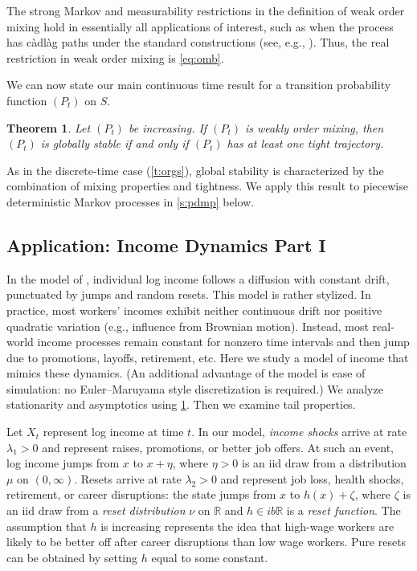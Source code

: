 \documentclass[12pt,reqno]{amsart}
\numberwithin{equation}{section}
\newtheorem{theorem}{Theorem}[section]
\theoremstyle{definition}
\newcommand{\1}{\mathbbm{1}}
\newcommand{\RR}{\mathbb{R}}
\newcommand{\lam}{\lambda}
\newcommand{\navy}[1]{\textit{\textcolor{blue!40!black}{#1}}}
\begin{document}
The strong Markov and measurability restrictions in the definition of weak order
mixing hold in essentially all applications of interest, such as when the
process has c\`adl\`ag paths under the standard constructions (see, e.g.,
\cite{ethier2009markov}).  Thus, the real restriction in weak
order mixing is \eqref{eq:omb}.

We can now state our main continuous time result for 
a transition probability function $(P_t)$ on $S$.

\begin{theorem}\label{t:orgsnew}
    Let $(P_t)$ be increasing. If
    $(P_t)$ is weakly order mixing, then $(P_t)$ is globally stable if and only
    if $(P_t)$ has at least one tight trajectory.
\end{theorem}

As in the discrete-time case (\cref{t:orgs}), global stability is
characterized by the combination of mixing properties and tightness.
We apply this result to piecewise deterministic Markov processes in
\cref{s:pdmp} below.




\subsection{Application: Income Dynamics Part I}\label{ss:purejump}

In the model of \citet{gabaix2016dynamics}, individual log income follows a
diffusion with constant drift, punctuated by jumps and random resets.  This
model is rather stylized. In practice, most workers' incomes exhibit neither
continuous drift nor positive quadratic variation (e.g., influence from Brownian
motion). Instead, most real-world income processes 
remain constant for nonzero time intervals and then jump due to
promotions, layoffs, retirement, etc.  Here we
study a model of income that mimics these dynamics.
(An additional advantage of the model is ease of simulation: no Euler--Maruyama
style discretization is required.) We analyze stationarity and asymptotics using
\cref{t:orgsnew}.  Then we examine tail properties.

Let $X_t$ represent log income at time $t$.
In our model, \navy{income shocks} arrive at rate $\lam_1 > 0$ and represent raises,
promotions, or better job offers. At such an event, log income jumps from $x$ to
$x + \eta$, where $\eta > 0$ is an {\sc iid} draw from a distribution $\mu$ on
$(0,\infty)$.  Resets arrive at rate $\lam_2 > 0$ and represent job loss, health
shocks, retirement, or career disruptions: the state jumps from $x$ to $h(x) +
\zeta$, where $\zeta$ is an {\sc iid} draw from a \navy{reset distribution} $\nu$ on $\RR$
and $h \in ib\RR$ is a \navy{reset function}.  The assumption that $h$ is increasing
represents the idea that high-wage workers are likely to be better off after
career disruptions than low wage workers.  Pure resets can be obtained by
setting $h$ equal to some constant.
\end{document}
